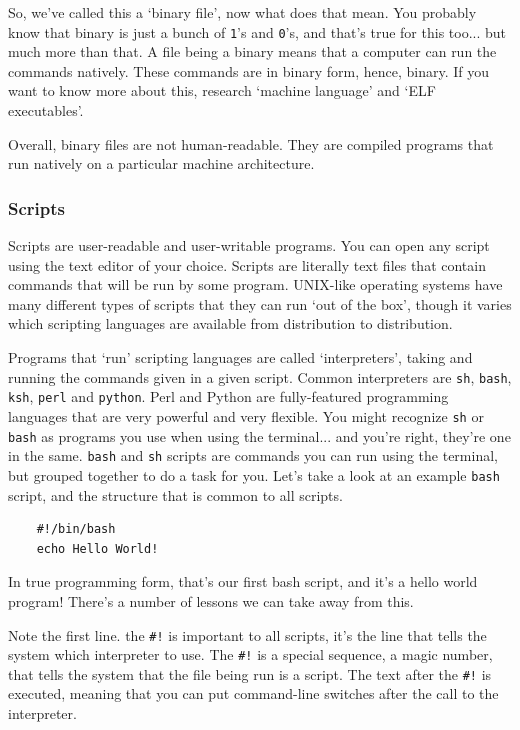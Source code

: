 	So, we've called this a `binary file', now what does that mean. You probably know that 
	binary is just a bunch of {\tt 1}'s and {\tt 0}'s, and that's true for this too... but much
	more than that. A file being a binary means that a computer can run the commands natively. These
	commands are in binary form, hence, binary. If you want to know more about this, research `machine language'
	and `ELF executables'.
	
	Overall, binary files are not human-readable. They are compiled programs that run natively on a particular machine
	architecture.

\subsubsection {Scripts}
	Scripts are user-readable and user-writable programs.  You can open any script using
	the text editor of your choice. Scripts are literally text files that contain commands
	that will be run by some program. UNIX-like operating systems have many different
	types of scripts that they can run `out of the box', though it varies which scripting 
	languages are available from distribution to distribution.
	
	Programs that `run' scripting languages are called `interpreters', taking and running 
	the commands given in a given script. Common interpreters are {\tt sh}, {\tt bash}, {\tt ksh},
	{\tt perl} and {\tt python}. Perl and Python are fully-featured programming languages that
	are very powerful and very flexible.  You might recognize {\tt sh} or {\tt bash} as programs you
	use when using the terminal... and you're right, they're one in the same. {\tt bash} and {\tt sh}
	scripts are commands you can run using the terminal, but grouped together to do a task for you.
	Let's take a look at an example {\tt bash} script, and the structure that is common to all scripts.
	
	{\begin{verbatim}
	#!/bin/bash
	echo Hello World!
	\end{verbatim}
	}
	
	In true programming form, that's our first bash script, and it's a hello world program!
	There's a number of lessons we can take away from this.
	
	Note the first line. the {\tt \#!} is important to all scripts, it's the line that tells the 
	system which interpreter to use. The {\tt \#!} is a special sequence, a magic number, that 
	tells the system that the file being run is a script. The text after the {\tt \#!} is executed, meaning 
	that you can put command-line switches after the call to the interpreter.
	
